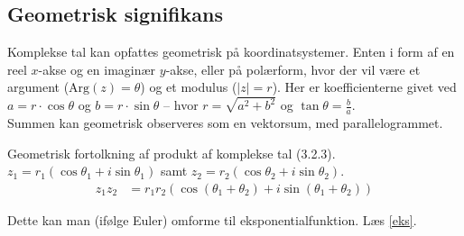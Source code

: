 \subsection{Geometrisk signifikans}
Komplekse tal kan opfattes geometrisk på koordinatsystemer. Enten i form af en reel $x$-akse og en imaginær $y$-akse, eller på polærform, hvor der vil være et argument ($\text{Arg}(z)=\theta$) og et modulus ($|z|=r$). Her er koefficienterne givet ved $a=r\cdot\cos{\theta}$ og $b=r\cdot\sin{\theta}$ -- hvor $r=\sqrt{a^2+b^2}$ og $\tan{\theta}=\frac{b}{a}$.\\
Summen kan geometrisk observeres som en vektorsum, med parallelogrammet. 
\begin{theorem}{Geometrisk fortolkning af produkt af komplekse tal (3.2.3).}
$z_1=r_1(\cos{\theta_1}+i\sin{\theta_1})$ samt $z_2=r_2(\cos{\theta_2}+i\sin{\theta_2})$.\begin{align}
    z_1z_2&=r_1r_2\left(\cos{(\theta_1+\theta_2)}+i\sin{(\theta_1+\theta_2)}\right)
\end{align}
\end{theorem}Dette kan man (ifølge Euler) omforme til eksponentialfunktion. Læs \ref{eks}.
